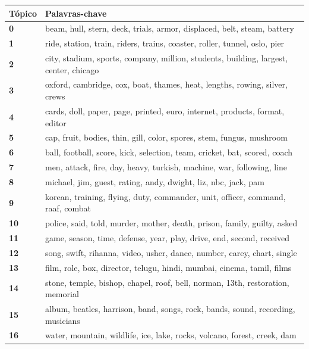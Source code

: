 \begin{table}[htpb]
    \centering
    \scriptsize
    \begin{tabularx}{\textwidth}{@{}l X@{}}
        \toprule
        \textbf{Tópico} & \textbf{Palavras-chave} \\
        \midrule
        \textbf{0} & beam, hull, stern, deck, trials, armor, displaced, belt, steam, battery \\
        \textbf{1} & ride, station, train, riders, trains, coaster, roller, tunnel, oslo, pier \\
        \textbf{2} & city, stadium, sports, company, million, students, building, largest, center, chicago \\
        \textbf{3} & oxford, cambridge, cox, boat, thames, heat, lengths, rowing, silver, crews \\
        \textbf{4} & cards, doll, paper, page, printed, euro, internet, products, format, editor \\
        \textbf{5} & cap, fruit, bodies, thin, gill, color, spores, stem, fungus, mushroom \\
        \textbf{6} & ball, football, score, kick, selection, team, cricket, bat, scored, coach \\
        \textbf{7} & men, attack, fire, day, heavy, turkish, machine, war, following, line \\
        \textbf{8} & michael, jim, guest, rating, andy, dwight, liz, nbc, jack, pam \\
        \textbf{9} & korean, training, flying, duty, commander, unit, officer, command, raaf, combat \\
        \textbf{10} & police, said, told, murder, mother, death, prison, family, guilty, asked \\
        \textbf{11} & game, season, time, defense, year, play, drive, end, second, received \\
        \textbf{12} & song, swift, rihanna, video, usher, dance, number, carey, chart, single \\
        \textbf{13} & film, role, box, director, telugu, hindi, mumbai, cinema, tamil, films \\
        \textbf{14} & stone, temple, bishop, chapel, roof, bell, norman, 13th, restoration, memorial \\
        \textbf{15} & album, beatles, harrison, band, songs, rock, bands, sound, recording, musicians \\
        \textbf{16} & water, mountain, wildlife, ice, lake, rocks, volcano, forest, creek, dam \\

\end{tabularx}
\end{table}
